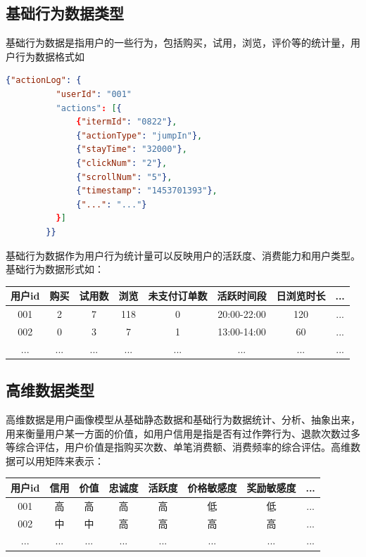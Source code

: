     \subsection{基础行为数据类型}
    基础行为数据是指用户的一些行为，包括购买，试用，浏览，评价等的统计量，用户行为数据格式如
      \begin{lstlisting}[language=json,firstnumber=1]
        {"actionLog": {
          "userId": "001"
          "actions": [{
              {"itermId": "0822"},
              {"actionType": "jumpIn"},
              {"stayTime": "32000"},
              {"clickNum": "2"},
              {"scrollNum": "5"},
              {"timestamp": "1453701393"},
              {"...": "..."}
          }]
        }}
      \end{lstlisting}
    基础行为数据作为用户行为统计量可以反映用户的活跃度、消费能力和用户类型。基础行为数据形式如：
      \begin{table}[htp]
      \centering
      \label{tab:tagweight}
      \begin{tabular}{|c|c|c|c|c|c|c|c|} \hline
       用户id & 购买 & 试用数 & 浏览 & 未支付订单数 & 活跃时间段 & 日浏览时长 & ... \\ \hline
       001 & 2 & 7 & 118 & 0 & 20:00-22:00 & 120 & ... \\ \hline
       002 & 0 & 3 & 7 & 1 & 13:00-14:00 & 60 & ... \\ \hline
       ... & ... & ... & ... & ... & ... & ... & ... \\ \hline
      \end{tabular}
      \end{table}

    \subsection{高维数据类型}
    高维数据是用户画像模型从基础静态数据和基础行为数据统计、分析、抽象出来，用来衡量用户某一方面的价值，如用户信用是指是否有过作弊行为、退款次数过多等综合评估，用户价值是指购买次数、单笔消费额、消费频率的综合评估。高维数据可以用矩阵来表示：
      \begin{table}[htp]
      \centering
      \label{tab:tagweight}
      \begin{tabular}{|c|c|c|c|c|c|c|c|} \hline
       用户id & 信用 & 价值 & 忠诚度 & 活跃度 & 价格敏感度 & 奖励敏感度 & ... \\ \hline
       001 & 高 & 高 & 高 & 高 & 低 & 低 & ... \\ \hline
       002 & 中 & 中 & 高 & 高 & 高 & 高 & ... \\ \hline
       ... & ... & ... & ... & ... & ... & ... & ... \\ \hline
      \end{tabular}
      \end{table}

